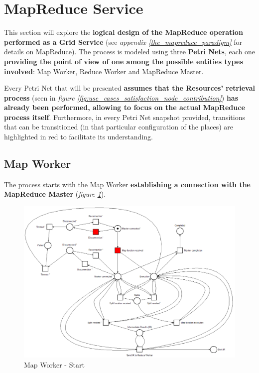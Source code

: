 \section{MapReduce Service}\label{mapreduce_service}
This section will explore the \textbf{logical design of the MapReduce operation performed as a Grid Service} (see \textit{appendix \ref{the_mapreduce_paradigm}} for details on MapReduce). The process is modeled using three \textbf{Petri Nets}, each one \textbf{providing the point of view of one among the possible entities types involved}: Map Worker, Reduce Worker and MapReduce Master.

Every Petri Net that will be presented \textbf{assumes that the Resources' retrieval process} (seen in \textit{figure \ref{fig:use_cases_satisfaction_node_contribution}}) \textbf{has already been performed, allowing to focus on the actual MapReduce process itself}.
Furthermore, in every Petri Net snapshot provided, transitions that can be transitioned (in that particular configuration of the places) are highlighted in red to facilitate its understanding.
  
\subsection{Map Worker}
The process starts with the Map Worker \textbf{establishing a connection with the MapReduce Master} (\textit{figure \ref{fig:map_worker_petri_net_1}}).

\vspace{5mm}

\begin{figure}[!ht]
    \centering
    \includegraphics[width=\linewidth]{document/chapters/chapter_5/images/map_worker_petri_net_1.png}
    \caption{Map Worker - Start}
    \label{fig:map_worker_petri_net_1}
\end{figure}

